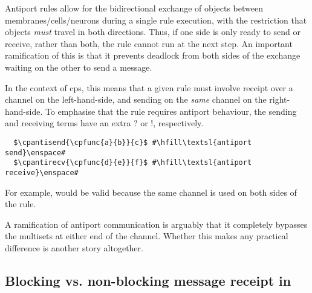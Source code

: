 Antiport rules \cite{Orellana-Martin2019,Paun2002} allow for the bidirectional exchange of objects between membranes/cells/neurons during a single rule execution, with the restriction that objects \emph{must} travel in both directions.  Thus, if one side is only ready to send or receive, rather than both, the rule cannot run at the next step.  An important ramification of this is that it prevents deadlock from both sides of the exchange waiting on the other to send a message.


In the context of \gls{cps}, this means that a given rule must involve receipt over a channel on the left-hand-side, and sending on the \emph{same} channel on the right-hand-side.  To emphasise that the rule requires antiport behaviour, the sending and receiving terms have an extra ? or !, respectively.

\lstset{xleftmargin=.5in, xrightmargin=.5in} 
\begin{lstlisting}
  $\cpantisend{\cpfunc{a}{b}}{c}$ #\hfill\textsl{antiport send}\enspace#
  $\cpantirecv{\cpfunc{d}{e}}{f}$ #\hfill\textsl{antiport receive}\enspace#
\end{lstlisting}

For example,  would be valid because the same channel is used on both sides of the rule.

\begin{anfxwarning}
A ramification of antiport communication is arguably that it completely bypasses the multisets at either end of the channel.  Whether this makes any practical difference is another story altogether.
\end{anfxwarning}

\subsection{\label{sec:cps:blocking}Blocking vs. non-blocking message receipt in }

